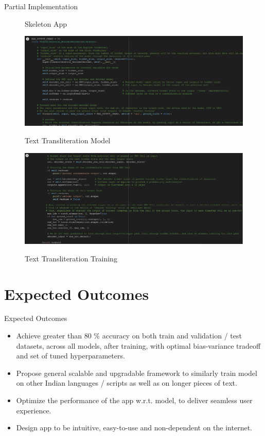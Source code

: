 \documentclass{beamer}
\begin{document}
\begin{frame}[allowframebreaks]{Partial Implementation}
\begin{figure}
\begin{subfigure}[b]{0.2\linewidth}
			\label{App}
           \end{subfigure}
	\caption{Skeleton App}
	\end{figure}
	\framebreak
	\begin{figure}
				{\includegraphics[scale=.3]{Translit_Model_1}}
				\caption{Text Transliteration Model}
				\label{Translit_Model_1}
	\end{figure}
	\begin{figure}
				{\includegraphics[scale=.3]{Translit_Model_2}}
				\caption{Text Transliteration Training}
				\label{Translit_Model_1}
	\end{figure}
\end{frame}

\section{Expected Outcomes}
\begin{frame}[allowframebreaks]{Expected Outcomes}
\begin{itemize}
\item Achieve greater than 80 \% accuracy on both train and validation / test datasets, across all models, after training, with optimal bias-variance tradeoff and set of tuned hyperparameters.
\item Propose general scalable and upgradable framework to similarly train model on other Indian languages / scripts as well as on longer pieces of text. 
\item Optimize the performance of the app w.r.t. model, to deliver seamless user experience.
\item Design app to be intuitive, easy-to-use and non-dependent on the internet.
\end{itemize} 
\end{frame}
\end{document}
